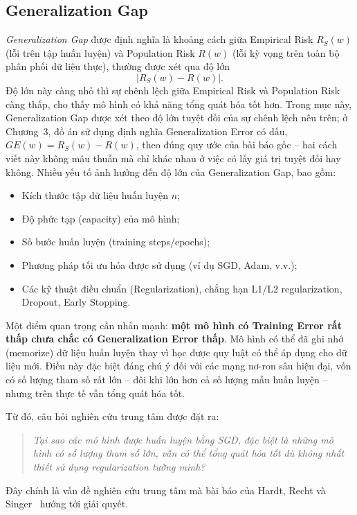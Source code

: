 \subsection{Generalization Gap}

\textit{Generalization Gap} được định nghĩa là khoảng cách giữa Empirical Risk $R_S(w)$ (lỗi trên tập huấn luyện) và Population Risk $R(w)$ (lỗi kỳ vọng trên toàn bộ phân phối dữ liệu thực), thường được xét qua độ lớn
\[
|R_S(w) - R(w)|.
\]
Độ lớn này càng nhỏ thì sự chênh lệch giữa Empirical Risk và Population Risk càng thấp, cho thấy mô hình có khả năng tổng quát hóa tốt hơn. Trong mục này, Generalization Gap được xét theo độ lớn tuyệt đối của sự chênh lệch nêu trên; ở Chương~3, đồ án sử dụng định nghĩa Generalization Error có dấu, $GE(w) = R_S(w) - R(w)$, theo đúng quy ước của bài báo gốc -- hai cách viết này không mâu thuẫn mà chỉ khác nhau ở việc có lấy giá trị tuyệt đối hay không. Nhiều yếu tố ảnh hưởng đến độ lớn của Generalization Gap, bao gồm:
\begin{itemize}
    \item Kích thước tập dữ liệu huấn luyện $n$;
    \item Độ phức tạp (capacity) của mô hình;
    \item Số bước huấn luyện (training steps/epochs);
    \item Phương pháp tối ưu hóa được sử dụng (ví dụ SGD, Adam, v.v.);
    \item Các kỹ thuật điều chuẩn (Regularization), chẳng hạn L1/L2 regularization, Dropout, Early Stopping.
\end{itemize}

Một điểm quan trọng cần nhấn mạnh: \textbf{một mô hình có Training Error rất thấp chưa chắc có Generalization Error thấp}. Mô hình có thể đã ghi nhớ (memorize) dữ liệu huấn luyện thay vì học được quy luật có thể áp dụng cho dữ liệu mới. Điều này đặc biệt đáng chú ý đối với các mạng nơ-ron sâu hiện đại, vốn có số lượng tham số rất lớn -- đôi khi lớn hơn cả số lượng mẫu huấn luyện -- nhưng trên thực tế vẫn tổng quát hóa tốt.

Từ đó, câu hỏi nghiên cứu trung tâm được đặt ra:

\begin{quote}
\textit{Tại sao các mô hình được huấn luyện bằng SGD, đặc biệt là những mô hình có số lượng tham số lớn, vẫn có thể tổng quát hóa tốt dù không nhất thiết sử dụng regularization tường minh?}
\end{quote}

Đây chính là vấn đề nghiên cứu trung tâm mà bài báo của Hardt, Recht và Singer~\cite{hardt2016train} hướng tới giải quyết.


